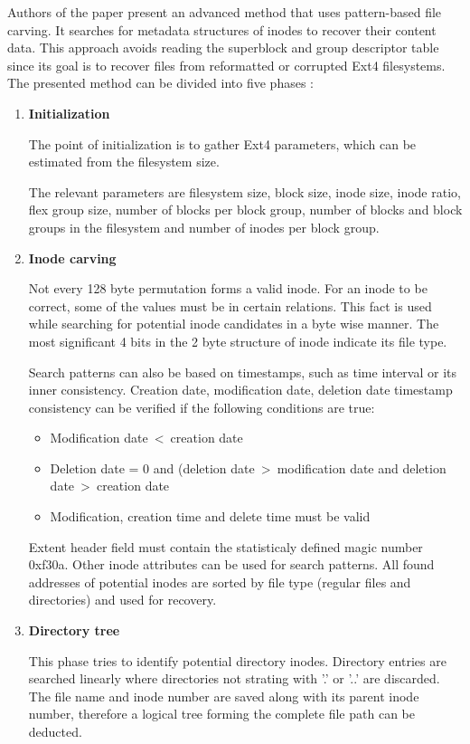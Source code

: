 \documentclass{acm_proc_article-sp}
\begin{document}
Authors of the paper present an advanced method that uses pattern-based file carving. It searches for metadata structures of inodes to recover their content data. This approach avoids reading the superblock and group descriptor table since its goal is to recover files from reformatted or corrupted Ext4 filesystems. The presented method can be divided into five phases \cite{dewald2017afeic}:
\begin{enumerate}
\item \textbf{Initialization}

The point of initialization  is to gather Ext4 parameters, which can be estimated from the filesystem size.
		
		The relevant parameters are filesystem size, block size, inode size, inode ratio, flex group size, number of blocks per block group, number of blocks and block groups in the filesystem and number of inodes per block group.

\item \textbf{Inode carving}

Not every 128 byte permutation forms a valid inode. For an inode to be correct, some of the values must be in certain relations. This fact is used while searching for potential inode candidates in a byte wise manner. The most significant 4 bits in the 2 byte structure of inode indicate its file type.

Search patterns can also be based on timestamps, such as time interval or its inner consistency. Creation date, modification date, deletion date timestamp consistency can be verified if the following conditions are true:
\begin{itemize}
\item Modification date\ \textless\ creation date
\item Deletion date = 0 and (deletion date\ \textgreater\ modification date and deletion date\ \textgreater\ creation date
\item Modification, creation time and delete time must be valid
\end{itemize}
Extent header field must contain the statisticaly defined magic number 0xf30a. Other inode attributes can be used for search patterns. All found addresses of potential inodes are sorted by file type (regular files and directories) and used for recovery.
\item \textbf{Directory tree}

This phase tries to identify potential directory inodes. Directory entries are searched linearly where directories not strating with '.' or '..' are discarded. The file name and inode number are saved along with its parent inode number, therefore a logical tree forming the complete file path can be deducted.


\end{enumerate}
\end{document}
